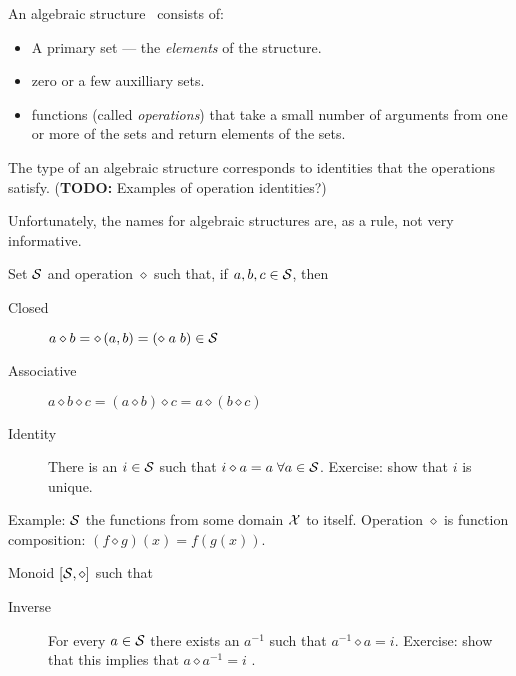 \label{sec:Algebraic-structures}

An algebraic 
structure~\cite{
wiki:Algebraic-structure,
wiki:Mathematical-structure,
wiki:Outline-of-algebraic-structures}
consists of:
\begin{itemize}
  \item A primary set --- the \textit{elements} of the structure.
  \item zero or a few auxilliary sets.
  \item functions (called \textit{operations})
that take a small number of arguments from one or more of the sets
and return elements of the sets.
\end{itemize}

The type of an algebraic structure corresponds to identities
that the operations satisfy.
(\textbf{TODO:} Examples of operation identities?)

Unfortunately, the names for algebraic structures 
are, as a rule, not very informative.


Set ${\mathcal{S}}$ and operation $\diamond$ such that,
if $a, b, c \in {\mathcal{S}}$, then
\begin{description}
\item[Closed] $a \diamond b = \diamond \left( a, b \right) 
= \left( \diamond \; a \; b \right) \in {\mathcal{S}}$
\item[Associative] $a \diamond b \diamond c =
 \left( a \diamond b \right) \diamond c =  
 a \diamond \left( b \diamond c \right) $
 \item[Identity] There is an $i \in {\mathcal{S}}$ such that 
 $i \diamond a = a \; \forall a \in {\mathcal{S}}$.
 Exercise: show that $i$ is unique.
 \end{description}

Example: 
${\mathcal{S}}$ the functions from some domain ${\mathcal{X}}$ to itself. 
Operation $\diamond$ is function composition:
$\left( f \diamond g \right) (x) = 
f \left( g \left( x \right) \right)$.


Monoid $\left[ {\mathcal{S}}, \diamond \right]$ such that
\begin{description}
 \item[Inverse] For every $a \in {\mathcal{S}}$ there exists an
 $a^{-1}$ such that $a^{-1} \diamond a = i$.
 Exercise: show that this implies that $a \diamond a^{-1} = i$ .
\end{description}

